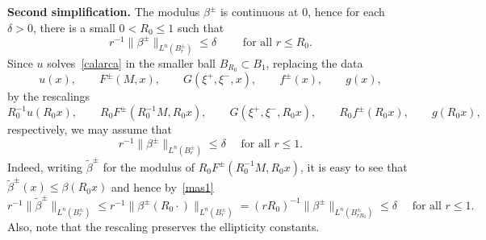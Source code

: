 \documentclass[letter,11pt]{amsart}
\theoremstyle{definition}
\numberwithin{equation}{section}
\begin{document}
\noindent\textbf{Second simplification.}
The modulus $\beta^{\pm}$ is continuous at $0$, hence for each $\delta >0$, there is a small $0 < R_0 \leq 1$ such that
\begin{equation}
\label{mas1}
r^{-1}\|\beta^{\pm}\|_{L^{n}(B_r^{\pm})} \leq \delta \qquad \text{ for all } r \leq R_0.
\end{equation}
Since $u$ solves~\eqref{calarca} in the smaller ball $B_{R_0} \subset B_1$, replacing the data 
\[
u(x), \qquad F^{\pm}(M, x), \qquad G(\xi^{+}, \xi^{-}, x), \qquad f^{\pm}(x), \qquad g(x),
\]
by the rescalings
\[
R_{0}^{-1}u(R_{0} x), 
\qquad 
R_{0} F^{\pm}(R_{0}^{-1} M, R_{0} x),
\qquad
G(\xi^{+}, \xi^{-}, R_{0} x),
\qquad
R_{0} f^{\pm}(R_{0} x),
\qquad g(R_{0} x),
\]
respectively, we may assume that 
\begin{equation}
\label{simp2}
r^{-1}\|\beta^{\pm}\|_{L^{n}(B_r^{\pm})} \leq \delta \quad \text{ for all } r \leq 1.
\end{equation}
Indeed, writing $\widetilde{\beta}^{\pm}$ for the modulus of $R_{0} F^{\pm}(R_{0}^{-1} M, R_{0} x)$, it is easy to see that $\widetilde{\beta}^{\pm}(x) \leq \beta (R_0 x)$ and hence by~\eqref{mas1}
\[
r^{-1}\|\widetilde{\beta}^{\pm}\|_{L^{n}(B_r^{\pm})} 
\leq r^{-1}\|\beta^{\pm}(R_{0} \cdot)\|_{L^{n}(B_r^{\pm})} = (r R_{0})^{-1} \|\beta^{\pm}\|_{L^{n}(B_{r R_{0}}^{\pm})} \leq \delta \quad \text{ for all } r \leq 1.
\]
Also, note that the rescaling preserves the ellipticity constants.

\medskip
\end{document}
